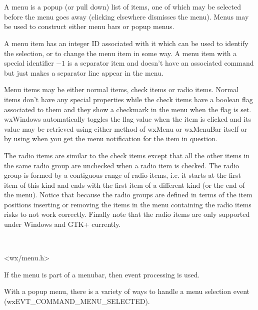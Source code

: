 \section{}\label{wxmenu}

A menu is a popup (or pull down) list of items, one of which may be
selected before the menu goes away (clicking elsewhere dismisses the
menu). Menus may be used to construct either menu bars or popup menus.

A menu item has an integer ID associated with it which can be used to
identify the selection, or to change the menu item in some way. A menu item
with a special identifier $-1$ is a separator item and doesn't have an
associated command but just makes a separator line appear in the menu.

Menu items may be either normal items, check items or radio items. Normal items
don't have any special properties while the check items have a boolean flag
associated to them and they show a checkmark in the menu when the flag is set.
wxWindows automatically toggles the flag value when the item is clicked and its
value may be retrieved using either  method
of wxMenu or wxMenuBar itself or by using 
 when you get the menu
notification for the item in question.

The radio items are similar to the check items except that all the other items
in the same radio group are unchecked when a radio item is checked. The radio
group is formed by a contiguous range of radio items, i.e. it starts at the
first item of this kind and ends with the first item of a different kind (or
the end of the menu). Notice that because the radio groups are defined in terms
of the item positions inserting or removing the items in the menu containing
the radio items risks to not work correctly. Finally note that the radio items
are only supported under Windows and GTK+ currently.


\\


<wx/menu.h>


If the menu is part of a menubar, then  event processing is used.

With a popup menu, there is a variety of ways to handle a menu selection event
(wxEVT\_COMMAND\_MENU\_SELECTED).

